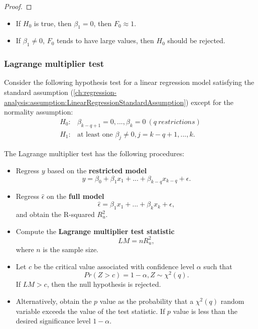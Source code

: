 \begin{refsection}
\begin{proof}
\end{proof}

\begin{remark}\hfill
	\begin{itemize}
		\item If $H_0$ is true, then $\beta_1 = 0 $, then $F_0 \approx 1$.
		\item If $\beta_1 \neq 0$, $F_0$ tends to have large values, then $H_0$ should be rejected. 
	\end{itemize}
\end{remark}


\subsubsection{Lagrange multiplier test}

\begin{method}\cite[176]{wooldridge2015introductory}
Consider the following hypothesis test for a linear regression model satisfying the standard assumption (\autoref{ch:regression-analysis:assumption:LinearRegressionStandardAssumption}) except for the normality assumption:
\begin{align*}
	H_0:& \beta_{k-q+1} = 0, ..., \beta_k = 0 ~(q~restrictions) \\
	H_1:& \text{at least one }\beta_j \neq 0, j=k-q+1,...,k.	
\end{align*}	


The Lagrange multiplier test has the following procedures:
\begin{itemize}
	\item Regress $y$ based on the \textbf{restricted model}
	$$y = \beta_0 + \beta_1x_1 + ... + \beta_{k-q}x_{k-q} + \epsilon.$$
	\item Regress $\hat{\epsilon}$ on the \textbf{full model}
	$$\hat{\epsilon} = \beta_{1}x_1 + ... + \beta_{k}x_{k} + \epsilon,$$
	and obtain the R-squared $R_u^2$.
	\item Compute the \textbf{Lagrange multiplier test statistic}
	$$LM = nR_u^2,$$
	 where $n$ is the sample size.
	\item Let $c$ be the critical value associated with confidence level $\alpha$  such that
	$$Pr(Z > c) = 1- \alpha, Z\sim \chi^2(q).$$
	If $LM > c$, then the null hypothesis is rejected.
	\item Alternatively, obtain the $p$ value as the probability that a $\chi^2(q)$ random variable exceeds the value of the test statistic. If $p$ value is less than the desired significance level $1-\alpha$.	 
	

\end{itemize}
\end{method}
\end{refsection}
